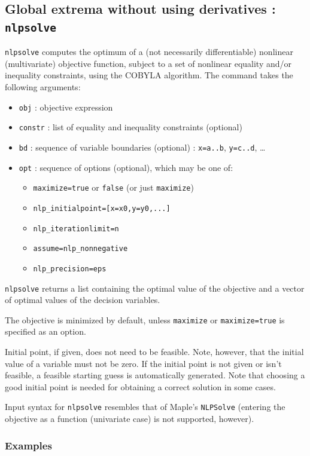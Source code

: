 \documentclass[a4paper,11pt]{book}
\begin{document}
\subsection{Global extrema without using derivatives : {\tt nlpsolve}}
{\tt nlpsolve} computes the optimum of a (not necessarily differentiable) nonlinear (multivariate) objective function, subject to a set of nonlinear equality and/or inequality constraints, using the COBYLA algorithm. The command takes the following arguments:
\begin{itemize}
	\item {\tt obj} : objective expression
	\item {\tt constr} : list of equality and inequality constraints (optional)
	\item {\tt bd} : sequence of variable boundaries (optional) : {\tt x=a..b}, {\tt y=c..d}, \ldots
	\item {\tt opt} : sequence of options (optional), which may be one of:
	\begin{itemize}
		\item {\tt maximize=true} or {\tt false} (or just {\tt maximize})
		\item {\tt nlp\_initialpoint=[x=x0,y=y0,...]}
		\item {\tt nlp\_iterationlimit=n}
		\item {\tt assume=nlp\_nonnegative}
		\item {\tt nlp\_precision=eps}
	\end{itemize}
\end{itemize}

{\tt nlpsolve} returns a list containing the optimal value of the objective and a vector of optimal values of the decision variables.

The objective is minimized by default, unless {\tt maximize} or {\tt maximize=true} is specified as an option.

Initial point, if given, does not need to be feasible. Note, however, that the initial value of a variable must not be zero. If the initial point is not given or isn't feasible, a feasible starting guess is automatically generated. Note that choosing a good initial point is needed for obtaining a correct solution in some cases.

Input syntax for {\tt nlpsolve} resembles that of Maple's {\tt NLPSolve} (entering the objective as a function (univariate case) is not supported, however).

\subsubsection{Examples}
\end{document}
